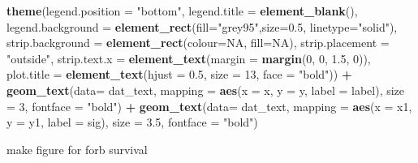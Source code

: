 \documentclass[
]{article}
\newenvironment{Shaded}{\begin{snugshade}}{\end{snugshade}}
\newcommand{\DataTypeTok}[1]{\textcolor[rgb]{0.13,0.29,0.53}{#1}}
\newcommand{\DecValTok}[1]{\textcolor[rgb]{0.00,0.00,0.81}{#1}}
\newcommand{\FloatTok}[1]{\textcolor[rgb]{0.00,0.00,0.81}{#1}}
\newcommand{\KeywordTok}[1]{\textcolor[rgb]{0.13,0.29,0.53}{\textbf{#1}}}
\newcommand{\NormalTok}[1]{#1}
\newcommand{\OperatorTok}[1]{\textcolor[rgb]{0.81,0.36,0.00}{\textbf{#1}}}
\newcommand{\OtherTok}[1]{\textcolor[rgb]{0.56,0.35,0.01}{#1}}
\newcommand{\StringTok}[1]{\textcolor[rgb]{0.31,0.60,0.02}{#1}}
\begin{document}
\begin{Shaded}
\begin{Highlighting}[]
\StringTok{  }\KeywordTok{theme}\NormalTok{(}\DataTypeTok{legend.position =} \StringTok{"bottom"}\NormalTok{, }\DataTypeTok{legend.title =} \KeywordTok{element\_blank}\NormalTok{(), }\DataTypeTok{legend.background =} \KeywordTok{element\_rect}\NormalTok{(}\DataTypeTok{fill=}\StringTok{"grey95"}\NormalTok{,}\DataTypeTok{size=}\FloatTok{0.5}\NormalTok{, }\DataTypeTok{linetype=}\StringTok{"solid"}\NormalTok{), }\DataTypeTok{strip.background =} \KeywordTok{element\_rect}\NormalTok{(}\DataTypeTok{colour=}\OtherTok{NA}\NormalTok{, }\DataTypeTok{fill=}\OtherTok{NA}\NormalTok{), }\DataTypeTok{strip.placement =} \StringTok{"outside"}\NormalTok{, }\DataTypeTok{strip.text.x =} \KeywordTok{element\_text}\NormalTok{(}\DataTypeTok{margin =} \KeywordTok{margin}\NormalTok{(}\DecValTok{0}\NormalTok{, }\DecValTok{0}\NormalTok{, }\FloatTok{1.5}\NormalTok{, }\DecValTok{0}\NormalTok{)), }\DataTypeTok{plot.title =} \KeywordTok{element\_text}\NormalTok{(}\DataTypeTok{hjust =} \FloatTok{0.5}\NormalTok{, }\DataTypeTok{size =} \DecValTok{13}\NormalTok{, }\DataTypeTok{face =} \StringTok{"bold"}\NormalTok{)) }\OperatorTok{+}
\StringTok{  }\KeywordTok{geom\_text}\NormalTok{(}\DataTypeTok{data=}\NormalTok{ dat\_text, }\DataTypeTok{mapping =} \KeywordTok{aes}\NormalTok{(}\DataTypeTok{x =}\NormalTok{ x, }\DataTypeTok{y =}\NormalTok{ y, }\DataTypeTok{label =}\NormalTok{ label), }\DataTypeTok{size =} \DecValTok{3}\NormalTok{, }\DataTypeTok{fontface =} \StringTok{"bold"}\NormalTok{) }\OperatorTok{+}
\StringTok{  }\KeywordTok{geom\_text}\NormalTok{(}\DataTypeTok{data=}\NormalTok{ dat\_text, }\DataTypeTok{mapping =} \KeywordTok{aes}\NormalTok{(}\DataTypeTok{x =}\NormalTok{ x1, }\DataTypeTok{y =}\NormalTok{ y1, }\DataTypeTok{label =}\NormalTok{ sig), }\DataTypeTok{size =} \FloatTok{3.5}\NormalTok{, }\DataTypeTok{fontface =} \StringTok{"bold"}\NormalTok{)}
\end{Highlighting}
\end{Shaded}

make figure for forb survival
\end{document}
